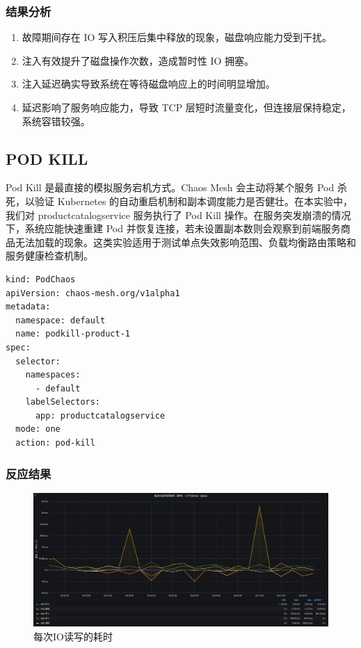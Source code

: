 \documentclass[hyperref,a4paper,UTF8]{ctexart}
\begin{document}
\subsubsection{结果分析}
\begin{enumerate}
    \item 故障期间存在 IO 写入积压后集中释放的现象，磁盘响应能力受到干扰。
    \item 注入有效提升了磁盘操作次数，造成暂时性 IO 拥塞。
    \item 注入延迟确实导致系统在等待磁盘响应上的时间明显增加。
    \item 延迟影响了服务响应能力，导致 TCP 层短时流量变化，但连接层保持稳定，系统容错较强。
\end{enumerate}

\subsection{POD KILL}
Pod Kill 是最直接的模拟服务宕机方式。Chaos Mesh 会主动将某个服务 Pod 杀死，以验证 Kubernetes 的自动重启机制和副本调度能力是否健壮。在本实验中，我们对 productcatalogservice 服务执行了 Pod Kill 操作。在服务突发崩溃的情况下，系统应能快速重建 Pod 并恢复连接，若未设置副本数则会观察到前端服务商品无法加载的现象。这类实验适用于测试单点失效影响范围、负载均衡路由策略和服务健康检查机制。

\begin{lstlisting}
kind: PodChaos
apiVersion: chaos-mesh.org/v1alpha1
metadata:
  namespace: default
  name: podkill-product-1
spec:
  selector:
    namespaces:
      - default
    labelSelectors:
      app: productcatalogservice
  mode: one
  action: pod-kill
\end{lstlisting}
\subsubsection{反应结果}
\begin{figure}[H]
    \centering
    \includegraphics[width=0.75\linewidth]{故障注入/8.png}
    \caption{每次IO读写的耗时}
    \label{fig:enter-label}
\end{figure}
\end{document}
